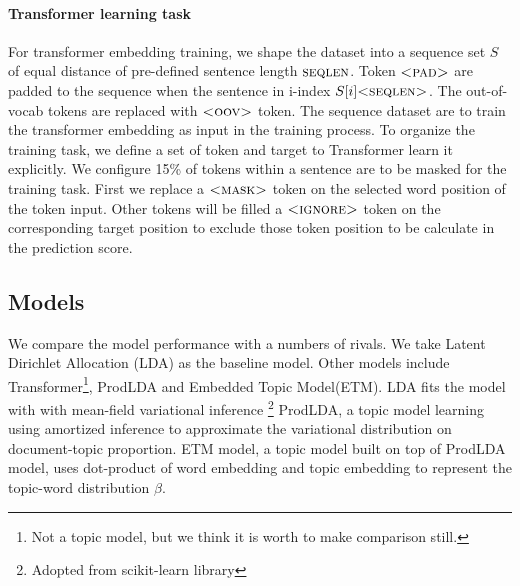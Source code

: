 \paragraph{Transformer learning task}\label{ch4:transformer_learning}
For transformer embedding training, we shape the dataset into a sequence set $ S $ of equal distance of pre-defined sentence length $ \textsc{seqlen} $. Token $ \textsc{<pad>} $ are padded to the sequence when the sentence in i-index $ S[i]\textsc{<seqlen>} $. The out-of-vocab tokens are replaced with $ \textsc{<oov>} $ token. The sequence dataset are to train the transformer embedding as input in the training process. To organize the training task, we define a set of token and target to Transformer learn it explicitly. We configure 15\% of tokens within a sentence are to be masked for the training task. First we replace a $ \textsc{<mask>} $ token on the selected word position of the token input. Other tokens will be filled a $ \textsc{<ignore>} $ token on the corresponding target position to exclude those token position to be calculate in the prediction score. 
\subsection{Models}\label{ch4:result_model}
We compare the model performance with a numbers of rivals. We take Latent Dirichlet Allocation (LDA)\cite{blei_latent_2003} as the baseline model. Other models include Transformer\cite{vaswani_attention_nodate}\footnote{Not a topic model, but we think it is worth to make comparison still.},  ProdLDA\cite{srivastava_autoencoding_2017} and Embedded Topic Model(ETM)\cite{dieng_topic_2019}.
LDA fits the model with with mean-field variational inference \footnote{Adopted from \textmd{scikit-learn} library}
ProdLDA, a topic model learning using amortized inference to approximate the variational distribution on document-topic proportion.
ETM model, a topic model built on top of ProdLDA model, uses dot-product of word embedding and topic embedding to represent the topic-word distribution $ \beta $.

